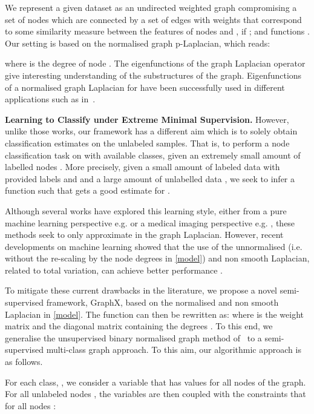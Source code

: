 \documentclass[runningheads]{llncs}
\begin{document}
We represent a given dataset as an undirected weighted graph   compromising a set of  nodes  which are connected by a set of edges  with weights  that correspond to some similarity measure  between the features of nodes  and ,   if  ; and functions . Our setting is based on the normalised graph p-Laplacian, which reads:

where  is the degree of node . The eigenfunctions of the graph Laplacian operator give interesting understanding of the substructures of the graph.  Eigenfunctions of a normalised graph Laplacian for  have been successfully used in different applications such as in~\cite{belkin2003Laplacian,chen2013inferring,dodero2014group}.



\smallskip


\textbf{Learning to Classify under Extreme Minimal Supervision.} However, unlike those works, our framework has a different aim which is to solely obtain classification estimates on the unlabeled samples. That is, to perform a node classification task on  with  available classes, given an extremely small amount of labelled nodes . More precisely,  given a small amount of labeled data  with provided labels   and  and a large amount of unlabelled data  , we seek to infer a function  such that  gets a good estimate for  .


Although several works have explored this learning style, either from a pure machine learning perspective e.g.\cite{zhu2003semi} or a medical imaging perspective e.g. \cite{wang2016progressive}, these methods seek to only approximate  in the graph Laplacian. However, recent developments on machine learning showed that the use of the unnormalised (i.e. without the re-scaling by the node degrees in  \eqref{model}) and non smooth  Laplacian, related to total variation, can achieve better performance \cite{Buhler2009}.

To mitigate these current drawbacks in the literature, we propose a novel semi-supervised framework, GraphX, based on the normalised and non smooth  Laplacian in \eqref{model}. The function can then be rewritten as:  where  is the weight matrix  and  the diagonal matrix containing the degrees . To this end, we generalise the unsupervised binary normalised graph method of~\cite{Feld2019} to a semi-supervised multi-class graph approach. To this aim, our algorithmic approach is as follows.

For each class, , we consider a variable  that has values for all nodes of the graph. For all unlabeled nodes , the  variables are then coupled with the constraints that for all nodes :
\end{document}
